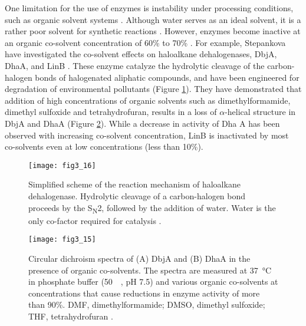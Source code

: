 \begin{refsection}
One limitation for the use of enzymes is instability under processing
conditions, such as organic solvent systems \cite{Stepankova2013}.
Although water serves as an ideal solvent, it is a rather poor solvent for
synthetic reactions \cite{Serdakowski2008}. However, enzymes become inactive at
an organic co-solvent concentration of 60\% to 70\% \cite{Stepankova2013}. For
example, Stepankova  have investigated the co-solvent effects on
haloalkane dehalogenases, DbjA, DhaA, and LinB \cite{Koudelakova2013}. These
enzyme catalyze the hydrolytic cleavage of the carbon-halogen bonds of
halogenated aliphatic compounds, and have been engineered for degradation of
environmental pollutants \cite{Stepankova2013a,Koudelakova2013} (Figure
\ref{fig:hld}). They have demonstrated that addition of high concentrations of
organic solvents such as dimethylformamide, dimethyl sulfoxide and
tetrahydrofuran, results in a loss of $\alpha$-helical structure in DbjA and
DhaA \cite{Stepankova2013a} (Figure \ref{fig:organic-effect}). While a decrease
in activity of Dha A has been observed with increasing co-solvent
concentration,  LinB is inactivated by most co-solvents even at low
concentrations (less than 10\%).
\begin{figure}[htbp] \centering \texttt{[image: fig3\_16]} 
    \caption[Simplified scheme of the reaction mechanism of haloalkane
    dehalogenase. Hydrolytic cleavage of a carbon-halogen bond proceeds by the
S\textsubscript{N}2, followed by the addition of water. Water is the only
co-factor required for catalysis]{Simplified scheme of the reaction mechanism
    of haloalkane dehalogenase. Hydrolytic cleavage of a carbon-halogen bond
    proceeds by the S\textsubscript{N}2, followed by the addition of water.
    Water is the only co-factor required for catalysis \cite{Koudelakova2013}.}
    \label{fig:hld}
\end{figure}
\begin{figure}[htbp] \centering \texttt{[image: fig3\_15]} 
    \caption[Circular dichroism spectra of (A) DbjA and (B) DhaA in the
    presence of organic co-solvents. The spectra are measured at
\SI{37}{\celsius} in phosphate buffer (\SI{50}{\milli\Molar}, pH 7.5) and
various organic co-solvents at concentrations that cause reductions in enzyme
activity of more than 90\%. DMF, dimethylformamide; DMSO, dimethyl sulfoxide;
THF, tetrahydrofuran.]{Circular dichroism spectra of (A) DbjA and (B) DhaA in
    the presence of organic co-solvents. The spectra are measured at
    \SI{37}{\celsius} in phosphate buffer (\SI{50}{\milli\Molar}, pH 7.5) and
    various organic co-solvents at concentrations that cause reductions in
    enzyme activity of more than 90\%. DMF, dimethylformamide; DMSO, dimethyl
    sulfoxide; THF, tetrahydrofuran \cite{Stepankova2013a}.}
    \label{fig:organic-effect} 
\end{figure}


\end{refsection}
